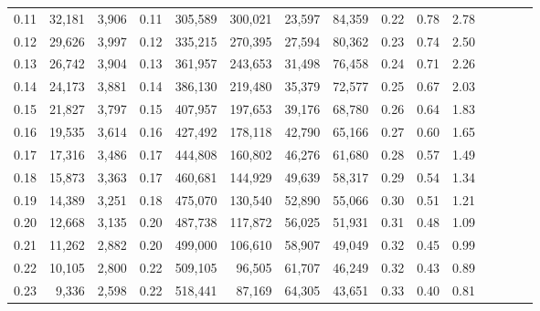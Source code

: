 \begin{tabular}{rrrcrrrrrrrrrrr}
0.11 &  32,181 &  3,906 &                                       0.11 &  305,589 &  300,021 &   23,597 &   84,359 &  0.22 &  0.78 &                         2.78 \\
0.12 &  29,626 &  3,997 &                                       0.12 &  335,215 &  270,395 &   27,594 &   80,362 &  0.23 &  0.74 &                         2.50 \\
0.13 &  26,742 &  3,904 &                                       0.13 &  361,957 &  243,653 &   31,498 &   76,458 &  0.24 &  0.71 &                         2.26 \\
0.14 &  24,173 &  3,881 &                                       0.14 &  386,130 &  219,480 &   35,379 &   72,577 &  0.25 &  0.67 &                         2.03 \\
0.15 &  21,827 &  3,797 &                                       0.15 &  407,957 &  197,653 &   39,176 &   68,780 &  0.26 &  0.64 &                         1.83 \\
0.16 &  19,535 &  3,614 &                                       0.16 &  427,492 &  178,118 &   42,790 &   65,166 &  0.27 &  0.60 &                         1.65 \\
0.17 &  17,316 &  3,486 &                                       0.17 &  444,808 &  160,802 &   46,276 &   61,680 &  0.28 &  0.57 &                         1.49 \\
0.18 &  15,873 &  3,363 &                                       0.17 &  460,681 &  144,929 &   49,639 &   58,317 &  0.29 &  0.54 &                         1.34 \\
0.19 &  14,389 &  3,251 &                                       0.18 &  475,070 &  130,540 &   52,890 &   55,066 &  0.30 &  0.51 &                         1.21 \\
0.20 &  12,668 &  3,135 &                                       0.20 &  487,738 &  117,872 &   56,025 &   51,931 &  0.31 &  0.48 &                         1.09 \\
0.21 &  11,262 &  2,882 &                                       0.20 &  499,000 &  106,610 &   58,907 &   49,049 &  0.32 &  0.45 &                         0.99 \\
0.22 &  10,105 &  2,800 &                                       0.22 &  509,105 &   96,505 &   61,707 &   46,249 &  0.32 &  0.43 &                         0.89 \\
0.23 &   9,336 &  2,598 &                                       0.22 &  518,441 &   87,169 &   64,305 &   43,651 &  0.33 &  0.40 &                         0.81 \\

\end{tabular}
